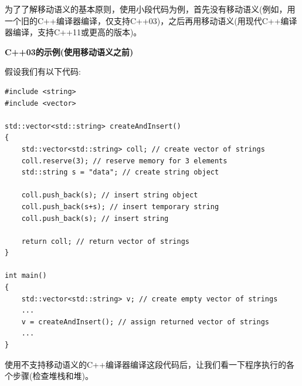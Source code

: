 为了了解移动语义的基本原则，使用小段代码为例，首先没有移动语义(例如，用一个旧的C++编译器编译，仅支持C++03)，之后再用移动语义(用现代C++编译器编译，支持C++11或更高的版本)。\par

\hspace*{\fill} \par %
\textbf{C++03的示例(使用移动语义之前)}

假设我们有以下代码:\par

{\color{red}{basics/motiv03.cpp}}

\begin{lstlisting}[caption={}]
#include <string>
#include <vector>

std::vector<std::string> createAndInsert()
{
	std::vector<std::string> coll; // create vector of strings
	coll.reserve(3); // reserve memory for 3 elements
	std::string s = "data"; // create string object
	
	coll.push_back(s); // insert string object
	coll.push_back(s+s); // insert temporary string
	coll.push_back(s); // insert string
	
	return coll; // return vector of strings
}

int main()
{
	std::vector<std::string> v; // create empty vector of strings
	...
	v = createAndInsert(); // assign returned vector of strings
	...
}
\end{lstlisting}

使用不支持移动语义的C++编译器编译这段代码后，让我们看一下程序执行的各个步骤(检查堆栈和堆)。\par

